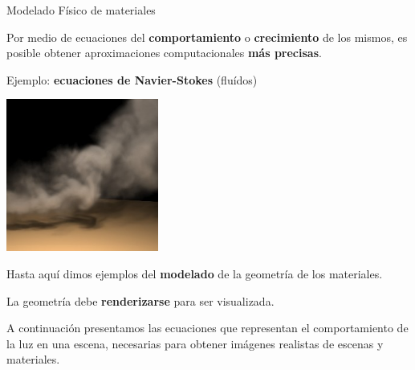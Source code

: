 \documentclass[spanish,unknownkeysallowed]{beamer}
\begin{document}
\begin{frame}{Modelado Físico de materiales}

Por medio de ecuaciones del \textbf{comportamiento} o \textbf{crecimiento} de los mismos, es posible obtener aproximaciones computacionales \textbf{más precisas}.

Ejemplo: \textbf{ecuaciones de Navier-Stokes} (fluídos)




\center
\includegraphics[width=5cm]{../figures/smoke}

\end{frame}

\begin{frame}

Hasta aquí dimos ejemplos del \textbf{modelado} de la geometría de los materiales.

\vspace{0.5cm}
La geometría debe \textbf{renderizarse} para ser visualizada.
\vspace{0.5cm}

A continuación presentamos las ecuaciones que representan el comportamiento de la luz en una escena, necesarias para obtener imágenes realistas de escenas y materiales.

\end{frame}
\end{document}
